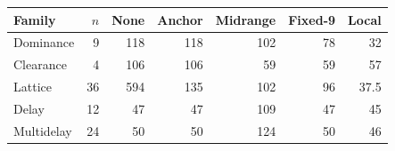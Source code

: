 \begin{tabular}{lrrrrrr}\toprule
Family & $n$ & None & Anchor & Midrange & Fixed-9 & Local\\\midrule
Dominance & 9 & 118 & 118 & 102 & 78 & 32\\
Clearance & 4 & 106 & 106 & 59 & 59 & 57\\
Lattice & 36 & 594 & 135 & 102 & 96 & 37.5\\
Delay & 12 & 47 & 47 & 109 & 47 & 45\\
Multidelay & 24 & 50 & 50 & 124 & 50 & 46\\
\bottomrule\end{tabular}